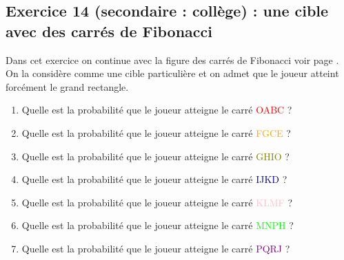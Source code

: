 \subsection{Exercice 14 (secondaire : collège) : une cible avec des carrés de Fibonacci}

\label{proba:niveau14}

Dans cet exercice on continue avec la figure des carrés de Fibonacci voir page \pageref{sol:niveau12}.
On la considère comme une cible particulière et on admet que le joueur atteint forcément le grand rectangle.

\begin{enumerate}[label=G\arabic*)]
	\item Quelle est la probabilité que le joueur atteigne le carré \textcolor{red}{OABC} ? 
	\item Quelle est la probabilité que le joueur atteigne le carré \textcolor{orange}{FGCE} ?
	\item Quelle est la probabilité que le joueur atteigne le carré \textcolor{olive}{GHIO} ?
	\item Quelle est la probabilité que le joueur atteigne le carré \textcolor{navy}{IJKD} ?
	\item Quelle est la probabilité que le joueur atteigne le carré \textcolor{pink}{KLMF} ?
	\item Quelle est la probabilité que le joueur atteigne le carré \textcolor{lime}{MNPH} ?
	\item Quelle est la probabilité que le joueur atteigne le carré \textcolor{purple}{PQRJ} ?    
\end{enumerate}
